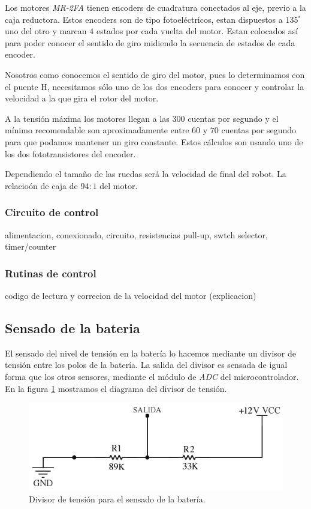 Los motores \emph{MR-2FA} tienen encoders de cuadratura conectados al eje, previo a la caja reductora.
Estos encoders son de tipo fotoel\'ectricos, estan dispuestos a $135^{\circ}$ uno del otro y marcan $4$ estados por
cada vuelta del motor.
Estan colocados as\'i para poder conocer el sentido de giro midiendo la secuencia de estados de cada encoder.

Nosotros como conocemos el sentido de giro del motor, pues lo determinamos con el puente H, necesitamos s\'olo
uno de los dos encoders para conocer y controlar la velocidad a la que gira el rotor del motor.

A la tensi\'on m\'axima los motores llegan a las 300 cuentas por segundo y el m\'inimo recomendable son aproximadamente
entre $60$ y $70$ cuentas por segundo para que podamos mantener un giro constante.
Estos c\'alculos son usando uno de los dos fototransistores del encoder.

Dependiendo el tama\~no de las ruedas ser\'a la velocidad de final del robot.
La relacio\'on de caja de $94:1$ del motor.

\subsubsection{Circuito de control}
\label{h_sensado_encoder_circuito}

alimentacion, conexionado, circuito, resistencias pull-up, swtch selector, timer/counter

\subsubsection{Rutinas de control}
\label{h_sensado_encoder_rutinas}

codigo de lectura y correcion de la velocidad del motor (explicacion)

\subsection{Sensado de la bateria}
\label{h_sensado_bateria}

El sensado del nivel de tensi\'on en la bater\'ia lo hacemos mediante un divisor de tensi\'on entre los polos de la bater\'ia.
La salida del divisor es sensada de igual forma que los otros sensores, mediante el m\'odulo de \emph{ADC} del microcontrolador.
En la figura \ref{hF_bateria_diagrama} mostramos el diagrama del divisor de tensi\'on.

\begin{figure}[ht]
	\centering
	\includegraphics[scale=0.35]{bateria.png}
	\caption{Divisor de tensi\'on para el sensado de la bater\'ia.}
	\label{hF_bateria_diagrama}
\end{figure}


